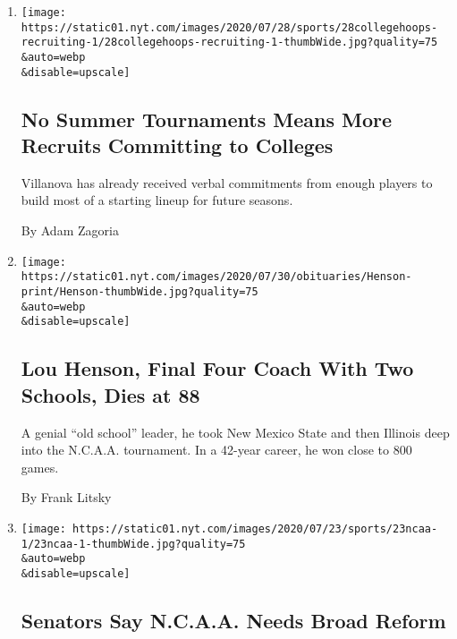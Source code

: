 \begin{enumerate}
\def\labelenumi{\arabic{enumi}.}
\item
  \href{/2020/07/30/sports/ncaabasketball/college-basketball-recruiting.html}{}

  \texttt{[image: https://static01.nyt.com/images/2020/07/28/sports/28collegehoops-recruiting-1/28collegehoops-recruiting-1-thumbWide.jpg?quality=75\\\&auto=webp\\\&disable=upscale]}

  \hypertarget{no-summer-tournaments-means-more-recruits-committing-to-colleges}{%
  \subsection{No Summer Tournaments Means More Recruits Committing to
  Colleges}\label{no-summer-tournaments-means-more-recruits-committing-to-colleges}}

  Villanova has already received verbal commitments from enough players
  to build most of a starting lineup for future seasons.

  By Adam Zagoria
\item
  \href{/2020/07/29/sports/ncaabasketball/lou-henson-dead.html}{}

  \texttt{[image: https://static01.nyt.com/images/2020/07/30/obituaries/Henson-print/Henson-thumbWide.jpg?quality=75\\\&auto=webp\\\&disable=upscale]}

  \hypertarget{lou-henson-final-four-coach-with-two-schools-dies-at-88}{%
  \subsection{Lou Henson, Final Four Coach With Two Schools, Dies at
  88}\label{lou-henson-final-four-coach-with-two-schools-dies-at-88}}

  A genial ``old school'' leader, he took New Mexico State and then
  Illinois deep into the N.C.A.A. tournament. In a 42-year career, he
  won close to 800 games.

  By Frank Litsky
\item
  \href{/2020/07/23/sports/ncaa-NIL-rights.html}{}

  \texttt{[image: https://static01.nyt.com/images/2020/07/23/sports/23ncaa-1/23ncaa-1-thumbWide.jpg?quality=75\\\&auto=webp\\\&disable=upscale]}

  \hypertarget{senators-say-ncaa-needs-broad-reform}{%
  \subsection{Senators Say N.C.A.A. Needs Broad
  Reform}\label{senators-say-ncaa-needs-broad-reform}}


\end{enumerate}

